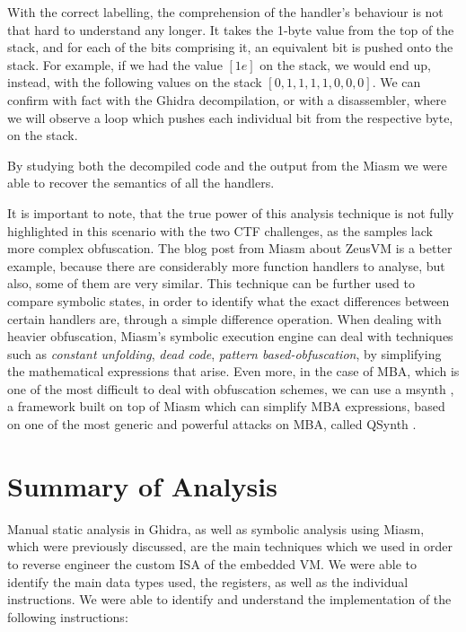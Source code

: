 With the correct labelling, the comprehension of the handler's behaviour is not that hard to understand any longer. It takes the 1-byte value from the top of the stack, and for each of the bits comprising it, an equivalent bit is pushed onto the stack. For example, if we had the value $[1e]$ on the stack, we would end up, instead, with the following values on the stack $[0, 1, 1, 1, 1, 0, 0, 0]$. We can confirm with fact with the Ghidra decompilation, or with a disassembler, where we will observe a loop which pushes each individual bit from the respective byte, on the stack. 

By studying both the decompiled code and the output from the Miasm we were able to recover the semantics of all the handlers. 

It is important to note, that the true power of this analysis technique is not fully highlighted in this scenario with the two \gls{CTF} challenges, as the samples lack more complex obfuscation. The blog post from Miasm about ZeusVM \cite{zeusvm_miasm} is a better example, because there are considerably more function handlers to analyse, but also, some of them are very similar. This technique can be further used to compare symbolic states, in order to identify what the exact differences between certain handlers are, through a simple difference operation. When dealing with heavier obfuscation, Miasm's symbolic execution engine can deal with techniques such as \emph{constant unfolding}, \emph{dead code}, \emph{pattern based-obfuscation}, by simplifying the mathematical expressions that arise. Even more, in the case of \gls{MBA}, which is one of the most difficult to deal with obfuscation schemes, we can use a msynth \cite{msynth}, a framework built on top of Miasm which can simplify \gls{MBA} expressions, based on one of the most generic and powerful attacks on \gls{MBA}, called QSynth \cite{qsynth}.

\section{Summary of Analysis}

Manual static analysis in Ghidra, as well as symbolic analysis using Miasm, which were previously discussed, are the main techniques which we used in order to reverse engineer the custom \gls{ISA} of the embedded \gls{VM}. We were able to identify the main data types used, the registers, as well as the individual instructions. We were able to identify and understand the implementation of the following instructions: 


